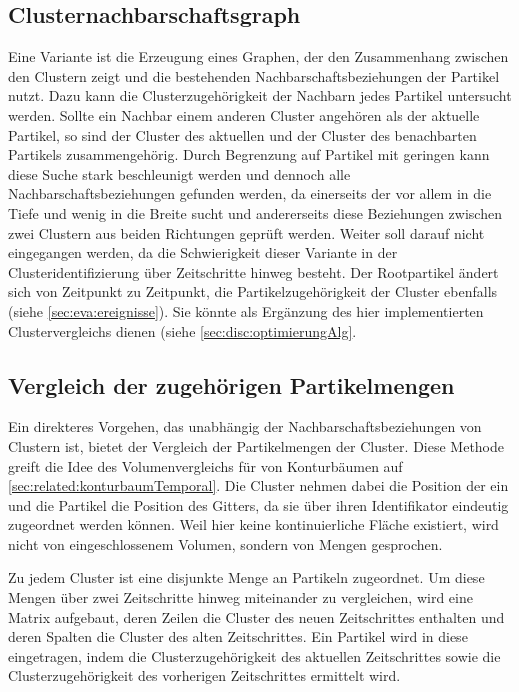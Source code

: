 \subsection*{Clusternachbarschaftsgraph}
Eine Variante ist die Erzeugung eines Graphen, der den Zusammenhang zwischen den Clustern zeigt und die bestehenden Nachbarschaftsbeziehungen der Partikel nutzt. Dazu kann die Clusterzugehörigkeit der Nachbarn jedes Partikel untersucht werden. Sollte ein Nachbar einem anderen Cluster angehören als der aktuelle Partikel, so sind der Cluster des aktuellen und der Cluster des benachbarten Partikels zusammengehörig. Durch Begrenzung auf Partikel mit geringen  kann diese Suche stark beschleunigt werden und dennoch alle Nachbarschaftsbeziehungen gefunden werden, da einerseits der \CFD vor allem in die Tiefe und wenig in die Breite sucht und andererseits diese Beziehungen zwischen zwei Clustern aus beiden Richtungen geprüft werden.
Weiter soll darauf nicht eingegangen werden, da die Schwierigkeit dieser Variante in der Clusteridentifizierung über Zeitschritte hinweg besteht. Der Rootpartikel ändert sich von Zeitpunkt zu Zeitpunkt, die Partikelzugehörigkeit der Cluster ebenfalls (siehe \autoref{sec:eva:ereignisse}). Sie könnte als Ergänzung des hier implementierten Clustervergleichs dienen (siehe \autoref{sec:disc:optimierungAlg}.

\subsection*{Vergleich der zugehörigen Partikelmengen}
Ein direkteres Vorgehen, das unabhängig der Nachbarschaftsbeziehungen von Clustern ist, bietet der Vergleich der Partikelmengen der Cluster. Diese Methode greift die Idee des Volumenvergleichs für  von Konturbäumen auf \autoref{sec:related:konturbaumTemporal}. Die Cluster nehmen dabei die Position der  ein und die Partikel die Position des Gitters, da sie über ihren Identifikator eindeutig zugeordnet werden können. Weil hier keine kontinuierliche Fläche existiert, wird nicht von eingeschlossenem Volumen, sondern von Mengen gesprochen.

Zu jedem Cluster ist eine disjunkte Menge an Partikeln zugeordnet. Um diese Mengen über zwei Zeitschritte hinweg miteinander zu vergleichen, wird eine Matrix aufgebaut, deren Zeilen die Cluster des neuen Zeitschrittes enthalten und deren Spalten die Cluster des alten Zeitschrittes. Ein Partikel wird in diese  eingetragen, indem die Clusterzugehörigkeit des aktuellen Zeitschrittes sowie die Clusterzugehörigkeit des vorherigen Zeitschrittes ermittelt wird.

